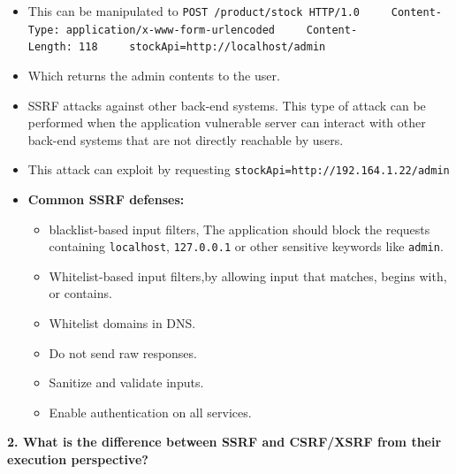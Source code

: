\begin{itemize}
\begin{Shaded}
\begin{Highlighting}[]
\OperatorTok{/}\OperatorTok{/}\OperatorTok{/}
\OperatorTok{{-}}\OperatorTok{:}\OperatorTok{/}\OperatorTok{{-}}\OperatorTok{{-}}\OperatorTok{{-}}
\OperatorTok{{-}}\OperatorTok{:} 
\OperatorTok{=}\OperatorTok{:}
\end{Highlighting}
\end{Shaded}
\item
  This can be manipulated to
  \texttt{POST\ /product/stock\ HTTP/1.0\ \ \ \ \ Content-Type:\ application/x-www-form-urlencoded\ \ \ \ \ Content-Length:\ 118\ \ \ \ \ stockApi=http://localhost/admin}
\item
  Which returns the admin contents to the user.
\item
  SSRF attacks against other back-end systems. This type of attack can
  be performed when the application vulnerable server can interact with
  other back-end systems that are not directly reachable by users.
\item
  This attack can exploit by requesting
  \texttt{stockApi=http://192.164.1.22/admin}
\item
  \textbf{Common SSRF defenses:}

  \begin{itemize}
  \tightlist
  \item
    blacklist-based input filters, The application should block the
    requests containing \texttt{localhost}, \texttt{127.0.0.1} or other
    sensitive keywords like \texttt{admin}.
  \item
    Whitelist-based input filters,by allowing input that matches, begins
    with, or contains.
  \item
    Whitelist domains in DNS.
  \item
    Do not send raw responses.
  \item
    Sanitize and validate inputs.
  \item
    Enable authentication on all services.
  \end{itemize}
\end{itemize}

\textbf{2. What is the difference between SSRF and CSRF/XSRF from their
execution perspective?}

